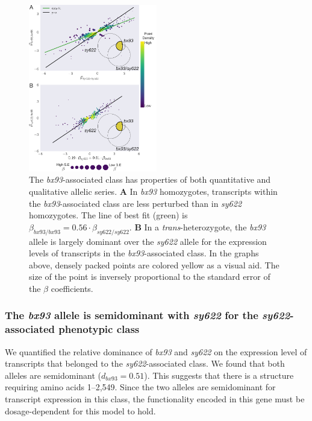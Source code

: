 \documentclass[10pt, twocolumn]{article}
\begin{document}
\begin{figure}
  \centering{}
  \includegraphics[width=0.5\textwidth]{../figs/bx93_associated_analysis.pdf}
  \caption{The \emph{bx93}-associated class has properties of both quantitative
    and qualitative allelic series.
    \textbf{A} In \emph{bx93}
    homozygotes, transcripts within the \emph{bx93}-associated class are
    less perturbed than in \emph{sy622}
    homozygotes. The line of best fit (green) is
    $\beta_{bx93/bx93}=0.56\cdot\beta_{sy622/sy622}$.
    \textbf{B} In a \emph{trans}-heterozygote, the \emph{bx93} allele is largely
    dominant over the \emph{sy622} allele for the expression levels of
    transcripts in the \emph{bx93}-associated class.
    In the graphs above, densely packed points are colored yellow as a visual
    aid. The size of the point is inversely proportional to the standard error
    of the $\beta$ coefficients.
    }
\label{fig:bx93_associated}
\end{figure}

\subsubsection*{The \emph{bx93} allele is semidominant with \emph{sy622} for the
                \emph{sy622}-associated phenotypic class}
We quantified the relative dominance of \emph{bx93} and \emph{sy622} on the
expression level of transcripts that belonged to the \emph{sy622}-associated
class. We found that both alleles are semidominant ($d_{bx93} = 0.51$). This
suggests that there is a structure requiring amino acids 1--2,549.
Since the two alleles are semidominant for transcript expression in this class,
the functionality encoded in this gene must be dosage-dependent for this model
to hold.
\end{document}
